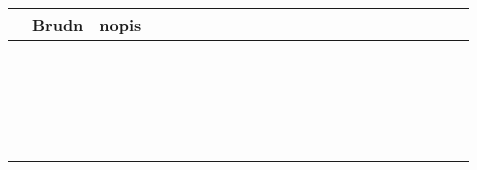 \documentclass[10pt]{article}
\begin{document}
\begin{center}
\begin{tabular}{|c|c|c|c|c|c|c|c|c|c|c|c|c|c|c|c|c|c|c|c|c|c|c|}
\hline
 & Brudn & nopis &  &  &  &  &  &  &  &  &  &  &  &  &  &  &  &  &  &  &  &  \\
\hline
 &  &  &  &  &  &  &  &  &  &  &  &  &  &  &  &  &  &  &  &  &  &  \\
\hline
 &  &  &  &  &  &  &  &  &  &  &  &  &  &  &  &  &  &  &  &  &  &  \\
\hline
 &  &  &  &  &  &  &  &  &  &  &  &  &  &  &  &  &  &  &  &  &  &  \\
\hline
 &  &  &  &  &  &  &  &  &  &  &  &  &  &  &  &  &  &  &  &  &  &  \\
\hline
 &  &  &  &  &  &  &  &  &  &  &  &  &  &  &  &  &  &  &  &  &  &  \\
\hline
 &  &  &  &  &  &  &  &  &  &  &  &  &  &  &  &  &  &  &  &  &  &  \\
\hline
 &  &  &  &  &  &  &  &  &  &  &  &  &  &  &  &  &  &  &  &  &  &  \\
\hline
 &  &  &  &  &  &  &  &  &  &  &  &  &  &  &  &  &  &  &  &  &  &  \\
\hline
 &  &  &  &  &  &  &  &  &  &  &  &  &  &  &  &  &  &  &  &  &  &  \\
\hline
 &  &  &  &  &  &  &  &  &  &  &  &  &  &  &  &  &  &  &  &  &  &  \\
\hline
 &  &  &  &  &  &  &  &  &  &  &  &  &  &  &  &  &  &  &  &  &  &  \\
\hline
 &  &  &  &  &  &  &  &  &  &  &  &  &  &  &  &  &  &  &  &  &  &  \\
\hline
 &  &  &  &  &  &  &  &  &  &  &  &  &  &  &  &  &  &  &  &  &  &  \\
\hline
 &  &  &  &  &  &  &  &  &  &  &  &  &  &  &  &  &  &  &  &  &  &  \\
\hline
 &  &  &  &  &  &  &  &  &  &  &  &  &  &  &  &  &  &  &  &  &  &  \\
\hline
 &  &  &  &  &  &  &  &  &  &  &  &  &  &  &  &  &  &  &  &  &  &  \\
\hline
 &  &  &  &  &  &  &  &  &  &  &  &  &  &  &  &  &  &  &  &  &  &  \\
\hline
 &  &  &  &  &  &  &  &  &  &  &  &  &  &  &  &  &  &  &  &  &  &  \\
\hline
 &  &  &  &  &  &  &  &  &  &  &  &  &  &  &  &  &  &  &  &  &  &  \\
\hline
 &  &  &  &  &  &  &  &  &  &  &  &  &  &  &  &  &  &  &  &  &  &  \\

\end{tabular}
\end{center}
\end{document}
